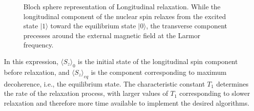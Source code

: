 \begin{figure}[htb]
\centering
{}
\label{fig:bloch_longitudinal}
\caption{Bloch sphere representation of Longitudinal relaxation. While the longitudinal component of the nuclear spin relaxes from the excited state $|1\rangle$ toward the equilibrium state $|0\rangle$, the transverse component precesses around the external magnetic field at the Larmor frequency.}
\end{figure}

In this expression, \(\langle S_z\rangle_0\) is the initial state of the longitudinal spin component before relaxation, and \(\langle S_z\rangle_{eq}\) is the component corresponding to maximum decoherence, i.e., the equilibrium state. The characteristic constant \(T_1\) determines the rate of the relaxation process, with larger values of \(T_1\) corresponding to slower relaxation and therefore more time available to implement the desired algorithms.

